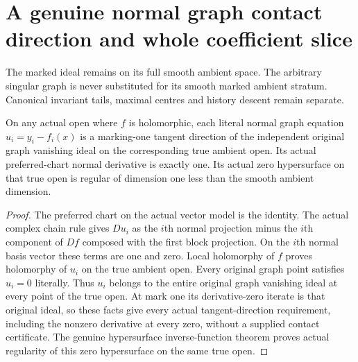 \section{A genuine normal graph contact direction and whole coefficient slice}

The marked ideal remains on its full smooth ambient space. The arbitrary
singular graph is never substituted for its smooth marked ambient stratum.
Canonical invariant tails, maximal centres and history descent remain separate.

\begin{theorem}
\label{hir:actual-graph-normal-tangent-direction}
\leanok
On any actual open where $f$ is holomorphic, each literal normal graph
equation $u_i=y_i-f_i(x)$ is a marking-one tangent direction of the
independent original graph vanishing ideal on the corresponding true
ambient open. Its actual preferred-chart normal derivative is exactly one.
Its actual zero hypersurface on that true open is regular of dimension
one less than the smooth ambient dimension.
\end{theorem}
\begin{proof}
The preferred chart on the actual vector model is the identity. The actual
complex chain rule gives $Du_i$ as the $i$th normal projection minus the
$i$th component of $Df$ composed with the first block projection. On the
$i$th normal basis vector these terms are one and zero. Local holomorphy
of $f$ proves holomorphy of $u_i$ on the true ambient open. Every original
graph point satisfies $u_i=0$ literally. Thus $u_i$ belongs to the entire
original graph vanishing ideal at every point of the true open. At mark
one its derivative-zero iterate is that original ideal, so these facts
give every actual tangent-direction requirement, including the nonzero
derivative at every zero, without a supplied contact certificate. The genuine
hypersurface inverse-function theorem proves actual regularity of this zero
hypersurface on the same true open.
\end{proof}

